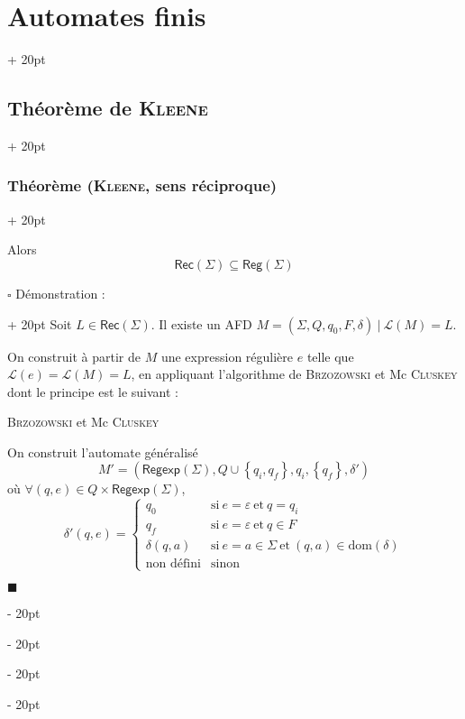 \documentclass[a4paper, 12pt, twoside]{article}
\newenvironment{indalgo}[2][H]{
    \begin{algoBox}
        \begin{algorithm}[#1]
            \caption{#2}
}
{
        \end{algorithm}
    \end{algoBox}
}
\newcommand{\lr}[1]{\left( #1 \right)}
\newcommand{\set}[1]{\left\{ #1 \right\}}
\newcommand{\ind}[1][20pt]{\advance\leftskip + #1}
\newcommand{\deind}[1][20pt]{\advance\leftskip - #1}
\newenvironment{indt}[2][20pt]{#2 \par \ind[#1]}{\par \deind} %
\newenvironment{proof}[1][{Démonstration :}]{\begin{indt}{$\square$ #1}}{$\blacksquare$ \end{indt}}
\newcommand{\Reg}{\mathsf{Reg}}
\newcommand{\Regexp}{\mathsf{Regexp}}
\newcommand{\Rec}[1]{\mathsf{Rec}\!\lr{#1}}
\begin{document}
\begin{indt}{\section{Automates finis}}
\begin{indt}{\subsection{Théorème de \textsc{Kleene}}}
\begin{indt}{\subsubsection{Théorème (\textsc{Kleene}, sens réciproque)}}
\begin{emphBox}
                    Alors
                    \[
                        \Rec \Sigma \subseteq \Reg(\Sigma)
                    \]
                \end{emphBox}

                \vspace{6pt}
                
                \begin{proof}
                    Soit $L \in \Rec \Sigma$. Il existe un AFD $M = (\Sigma, Q, q_0, F, \delta)\ |\ \mathcal L(M) = L$.

                    On construit à partir de $M$ une expression régulière $e$ telle que $\mathcal L(e) = \mathcal L(M) = L$, en appliquant l'algorithme de \textsc{Brzozowski} et Mc \textsc{Cluskey} dont le principe est le suivant :

                    \begin{indalgo}{\textsc{Brzozowski} et Mc \textsc{Cluskey}}
                        \label{alg:4}

                        On construit l'automate généralisé
                        \[
                            M' = (\Regexp(\Sigma), Q \cup \set{q_i, q_f}, q_i, \set{q_f}, \delta')
                        \]
                        où
                        $\forall (q, e) \in Q \times \Regexp(\Sigma)$,
                        \[
                            \delta'(q, e) =
                            \begin{cases}
                                q_0
                                & \text{si}\ e = \varepsilon\ \text{et}\ q = q_i
                                \\
                                q_f
                                & \text{si}\ e = \varepsilon\ \text{et}\ q \in F
                                \\
                                \delta(q, a)
                                & \text{si}\ e = a \in \Sigma\ \text{et}\ (q, a) \in \mathrm{dom}(\delta)
                                \\
                                \text{non défini}
                                & \text{sinon}
                            \end{cases}
                        \]

                        \begin{center}
\end{center}
\end{indalgo}
\end{proof}
\end{indt}
\end{indt}
\end{indt}
\end{document}
